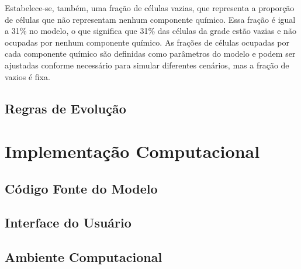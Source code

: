 \documentclass[12pt,oneside]{report}
\begin{document}
Estabelece-se, também, uma fração de células vazias, que representa a proporção de células que não representam nenhum componente químico. Essa fração é igual a 31\% no modelo, o que significa que 31\% das células da grade estão vazias e não ocupadas por nenhum componente químico. As frações de células ocupadas por cada componente químico são definidas como parâmetros do modelo e podem ser ajustadas conforme necessário para simular diferentes cenários, mas a fração de vazios é fixa.


\subsection{Regras de Evolução}

\section{Implementação Computacional}

\subsection{Código Fonte do Modelo}

\subsection{Interface do Usuário}


\subsection{Ambiente Computacional}
\end{document}
